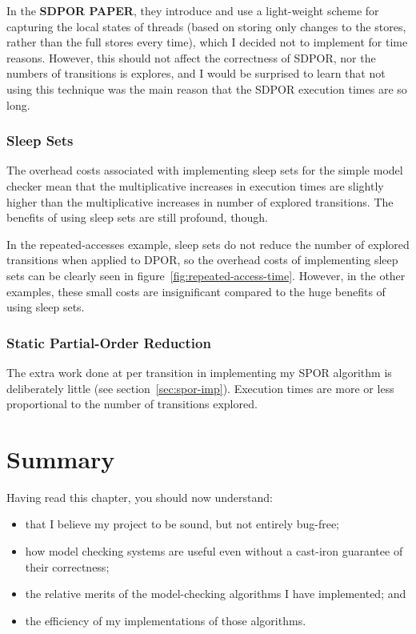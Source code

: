 \documentclass[12pt,a4paper,twoside,openright]{report}
\newenvironment{understandinglist}
	{\begin{itemize} \itemsep 0em}{\end{itemize}}
\begin{document}
In the \textbf{SDPOR PAPER}, they
introduce and use a light-weight
scheme for capturing the local states of
threads (based on storing only changes
to the stores, rather than the full stores
every time), which I decided not to
implement for time reasons. However,
this should not affect the correctness
of SDPOR, nor the numbers of transitions
is explores, and I would be surprised
to learn that not using this technique
was the main reason that the SDPOR
execution times are so long. 

\subsubsection{Sleep Sets}
The overhead costs associated with implementing
sleep sets for the simple model checker
mean that the multiplicative
increases in execution times are slightly
higher than the multiplicative increases
in number of explored transitions. The
benefits of using sleep sets are still
profound, though.

In the repeated-accesses example,
sleep sets do not reduce the number
of explored transitions when applied
to DPOR, so the overhead costs of
implementing sleep sets can be clearly
seen in figure~\ref{fig:repeated-access-time}.
However, in the other examples, these
small costs are insignificant compared
to the huge benefits of using sleep
sets.

\subsubsection{Static Partial-Order Reduction}
The extra work done at per transition
in implementing my SPOR
algorithm is deliberately little
(see section~\ref{sec:spor-imp}).
Execution times are more or less proportional
to the number of transitions explored.

\section{Summary}
Having read this chapter,
you should now understand:
\begin{understandinglist}
	\item that I believe my project to
	be sound, but not entirely bug-free;
	\item how model checking systems are
	useful even without a cast-iron guarantee
	of their correctness;
	\item the relative merits of the model-checking
	algorithms I have implemented; and
	\item the efficiency of my implementations of
	those algorithms.
	\end{understandinglist}
\end{document}
